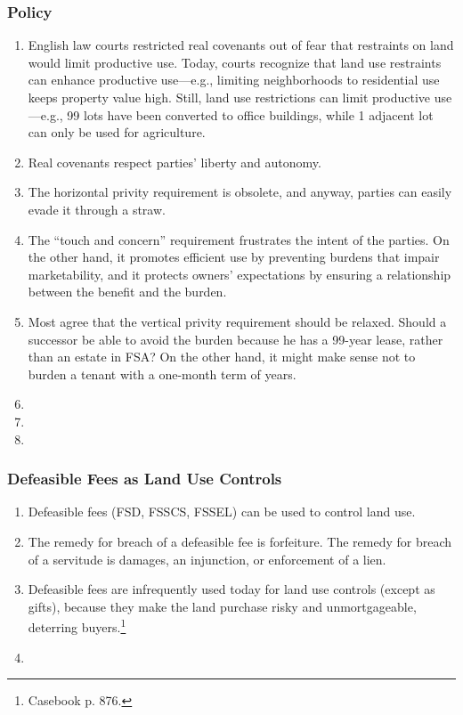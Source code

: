 \subsubsection{Policy}

\begin{enumerate}
    \item English law courts restricted real covenants out of fear that 
    restraints on land would limit productive use. Today, courts recognize 
    that land use restraints can enhance productive use---e.g., limiting 
    neighborhoods to residential use keeps property value high. Still, land 
    use restrictions can limit productive use---e.g., 99 lots have been 
    converted to office buildings, while 1 adjacent lot can only be used for 
    agriculture.
    \item Real covenants respect parties' liberty and autonomy.
    \item The horizontal privity requirement is obsolete, and anyway, parties 
    can easily evade it through a straw.
    \item The ``touch and concern'' requirement frustrates the intent of the 
    parties. On the other hand, it promotes efficient use by preventing 
    burdens that impair marketability, and it protects owners' expectations by 
    ensuring a relationship between the benefit and the burden.
    \item Most agree that the vertical privity requirement should be relaxed. 
    Should a successor be able to avoid the burden because he has a 99-year 
    lease, rather than an estate in FSA? On the other hand, it might make 
    sense not to burden a tenant with a one-month term of years.
    \item %
    \item %
    \item %
\end{enumerate}

\subsubsection{Defeasible Fees as Land Use Controls}

\begin{enumerate}
    \item Defeasible fees (FSD, FSSCS, FSSEL) can be used to control land use.
    \item The remedy for breach of a defeasible fee is forfeiture. The remedy 
    for breach of a servitude is damages, an injunction, or enforcement of a 
    lien.
    \item Defeasible fees are infrequently used today for land use controls 
    (except as gifts), because they make the land purchase risky and 
    unmortgageable, deterring buyers.\footnote{Casebook p. 876.}
    \item %
\end{enumerate}

